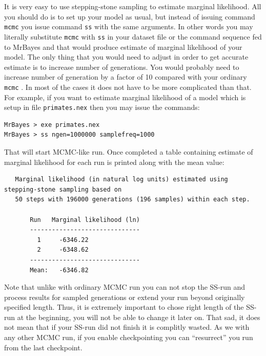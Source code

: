\documentclass[12pt]{book}
\newcommand{\ttt}[1]{\texttt{#1} }
\begin{document}
It is very easy to use stepping-stone sampling to estimate marginal likelihood. All you should do is to set up your model as usual,
 but instead of issuing command \ttt{mcmc} you issue command \ttt{ss} with the same arguments. In other words you may literally
 substitute \ttt{mcmc} with \ttt{ss} in your dataset file or the command sequence fed to MrBayes and that would produce estimate
 of marginal likelihood of your model. The only thing that you would need to adjust in order to get accurate estimate is to increase
 number of generations. You would probably need to increase number of generation by a factor of 10 compared with your ordinary \ttt{mcmc}.
 In most of the cases it does not have to be more complicated than that. For example, if you want to estimate marginal likelihood of a
 model which is setup in file \ttt{primates.nex} then you may issue the commands:

\begin{singlespacing}
\begin{verbatim}
MrBayes > exe primates.nex
MrBayes > ss ngen=1000000 samplefreq=1000
\end{verbatim}
\end{singlespacing}

That will start MCMC-like run. Once completed a table containing estimate of marginal likelihood for each run is printed
 along with the mean value: 

\begin{singlespacing}
\scriptsize
\begin{verbatim}
   Marginal likelihood (in natural log units) estimated using stepping-stone sampling based on
   50 steps with 196000 generations (196 samples) within each step.

       Run   Marginal likelihood (ln)
       ------------------------------
         1     -6346.22
         2     -6348.62
       ------------------------------
       Mean:   -6346.82
\end{verbatim}
\normalsize
\end{singlespacing}

Note that unlike with ordinary MCMC run you can not stop the SS-run and process results for sampled generations or extend your
 run beyond originally specified length. Thus, it is extremely important to chose right length of the SS-run at the beginning,
 you will not be able to change it later on. That sad, it does not mean that if your SS-run did not finish it is complitly wasted.
 As we with any other MCMC run, if you enable checkpointing you can “resurrect” you run from the last checkpoint. 
\end{document}
